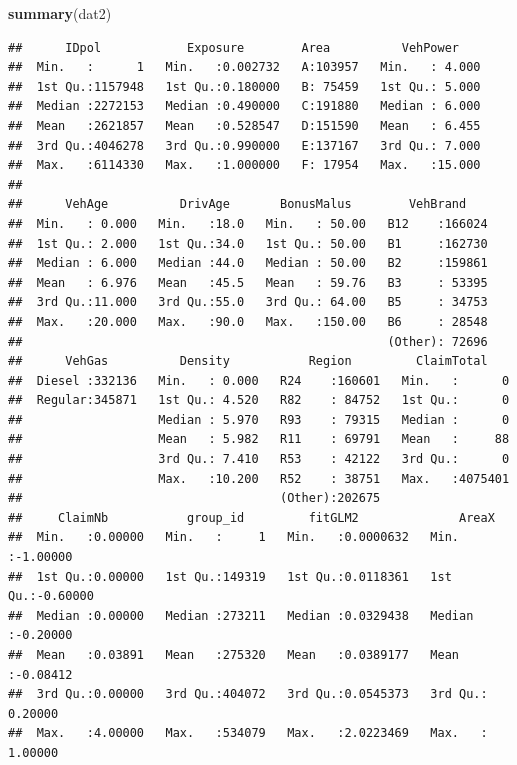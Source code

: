 \documentclass[
]{article}
\newenvironment{Shaded}{\begin{snugshade}}{\end{snugshade}}
\newcommand{\FunctionTok}[1]{\textcolor[rgb]{0.13,0.29,0.53}{\textbf{#1}}}
\newcommand{\NormalTok}[1]{#1}
\begin{document}
\begin{Shaded}
\begin{Highlighting}[]
\FunctionTok{summary}\NormalTok{(dat2)}
\end{Highlighting}
\end{Shaded}

\begin{verbatim}
##      IDpol            Exposure        Area          VehPower     
##  Min.   :      1   Min.   :0.002732   A:103957   Min.   : 4.000  
##  1st Qu.:1157948   1st Qu.:0.180000   B: 75459   1st Qu.: 5.000  
##  Median :2272153   Median :0.490000   C:191880   Median : 6.000  
##  Mean   :2621857   Mean   :0.528547   D:151590   Mean   : 6.455  
##  3rd Qu.:4046278   3rd Qu.:0.990000   E:137167   3rd Qu.: 7.000  
##  Max.   :6114330   Max.   :1.000000   F: 17954   Max.   :15.000  
##                                                                  
##      VehAge          DrivAge       BonusMalus        VehBrand     
##  Min.   : 0.000   Min.   :18.0   Min.   : 50.00   B12    :166024  
##  1st Qu.: 2.000   1st Qu.:34.0   1st Qu.: 50.00   B1     :162730  
##  Median : 6.000   Median :44.0   Median : 50.00   B2     :159861  
##  Mean   : 6.976   Mean   :45.5   Mean   : 59.76   B3     : 53395  
##  3rd Qu.:11.000   3rd Qu.:55.0   3rd Qu.: 64.00   B5     : 34753  
##  Max.   :20.000   Max.   :90.0   Max.   :150.00   B6     : 28548  
##                                                   (Other): 72696  
##      VehGas          Density           Region         ClaimTotal     
##  Diesel :332136   Min.   : 0.000   R24    :160601   Min.   :      0  
##  Regular:345871   1st Qu.: 4.520   R82    : 84752   1st Qu.:      0  
##                   Median : 5.970   R93    : 79315   Median :      0  
##                   Mean   : 5.982   R11    : 69791   Mean   :     88  
##                   3rd Qu.: 7.410   R53    : 42122   3rd Qu.:      0  
##                   Max.   :10.200   R52    : 38751   Max.   :4075401  
##                                    (Other):202675                    
##     ClaimNb           group_id         fitGLM2              AreaX         
##  Min.   :0.00000   Min.   :     1   Min.   :0.0000632   Min.   :-1.00000  
##  1st Qu.:0.00000   1st Qu.:149319   1st Qu.:0.0118361   1st Qu.:-0.60000  
##  Median :0.00000   Median :273211   Median :0.0329438   Median :-0.20000  
##  Mean   :0.03891   Mean   :275320   Mean   :0.0389177   Mean   :-0.08412  
##  3rd Qu.:0.00000   3rd Qu.:404072   3rd Qu.:0.0545373   3rd Qu.: 0.20000  
##  Max.   :4.00000   Max.   :534079   Max.   :2.0223469   Max.   : 1.00000  

\end{verbatim}
\end{document}
